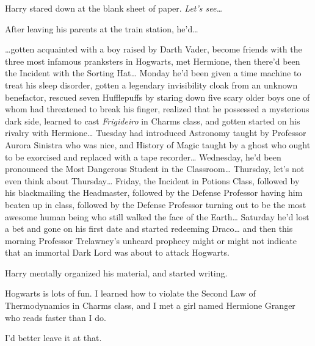 Harry stared down at the blank sheet of paper. \emph{Let's see{\ldots}}

After leaving his parents at the train station, he'd{\ldots}

{\ldots}gotten acquainted with a boy raised by Darth Vader, become friends with
the three most infamous pranksters in Hogwarts, met Hermione, then there'd been
the Incident with the Sorting Hat{\ldots} Monday he'd been given a time machine
to treat his sleep disorder, gotten a legendary invisibility cloak from an
unknown benefactor, rescued seven Hufflepuffs by staring down five scary older
boys one of whom had threatened to break his finger, realized that he possessed
a mysterious dark side, learned to cast \emph{Frigideiro} in Charms class, and
gotten started on his rivalry with Hermione{\ldots} Tuesday had introduced
Astronomy taught by Professor Aurora Sinistra who was nice, and History of
Magic taught by a ghost who ought to be exorcised and replaced with a tape
recorder{\ldots} Wednesday, he'd been pronounced the Most Dangerous Student in
the Classroom{\ldots} Thursday, let's not even think about Thursday{\ldots}
Friday, the Incident in Potions Class, followed by his blackmailing the
Headmaster, followed by the Defense Professor having him beaten up in class,
followed by the Defense Professor turning out to be the most awesome human
being who still walked the face of the Earth{\ldots} Saturday he'd lost a bet
and gone on his first date and started redeeming Draco{\ldots} and then this
morning Professor Trelawney's unheard prophecy might or might not indicate that
an immortal Dark Lord was about to attack Hogwarts.

Harry mentally organized his material, and started writing.

\begin{writtenNote}

Hogwarts is lots of fun. I learned how to violate the Second Law of
Thermodynamics in Charms class, and I met a girl named Hermione Granger who
reads faster than I do.

I'd better leave it at that.

\end{writtenNote}
